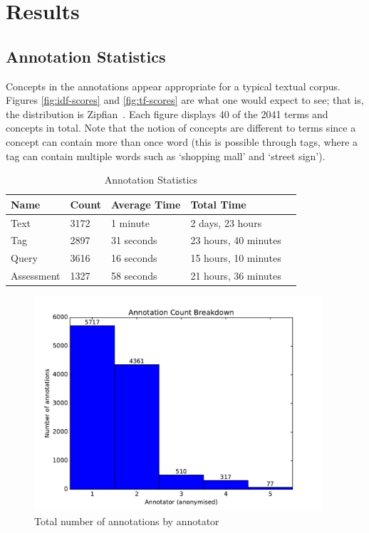 \chapter{Results}

\section{Annotation Statistics}

Concepts in the annotations appear appropriate for a typical textual corpus. Figures \ref{fig:idf-scores} and \ref{fig:tf-scores} are what one would expect to see; that is, the distribution is Zipfian~\cite{tullo2003modelling}. Each figure displays 40 of the 2041 terms and concepts in total. Note that the notion of concepts are different to terms since a concept can contain more than once word (this is possible through tags, where a tag can contain multiple words such as `shopping mall' and `street sign').

\begin{table}[b]
    \centering
    \begin{tabular}{ | l | l | l | l | p{5cm} |}
    \hline
    Name & Count & Average Time & Total Time \\ \hline
    Text & 3172 & 1 minute & 2 days, 23 hours \\ \hline
    Tag & 2897 & 31 seconds & 23 hours, 40 minutes \\ \hline
    Query & 3616 & 16 seconds & 15 hours, 10 minutes \\ \hline
    Assessment & 1327 & 58 seconds & 21 hours, 36 minutes \\ \hline
    \end{tabular}
    \caption{Annotation Statistics}
    \label{table:annotation-stats}
\end{table}

\begin{figure}[h]
    \centering
    \includegraphics[width=0.95\textwidth]{graphs/annotator-breakdown}
    \caption{Total number of annotations by annotator}
    \label{fig:annotator-breakdown}
\end{figure}

